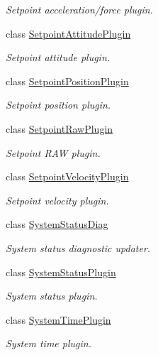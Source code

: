 \begin{DoxyCompactItemize}
\begin{DoxyCompactList}\small\item\em Setpoint acceleration/force plugin. \end{DoxyCompactList}\item 
class \mbox{\hyperlink{classmavros_1_1std__plugins_1_1SetpointAttitudePlugin}{Setpoint\+Attitude\+Plugin}}
\begin{DoxyCompactList}\small\item\em Setpoint attitude plugin. \end{DoxyCompactList}\item 
class \mbox{\hyperlink{classmavros_1_1std__plugins_1_1SetpointPositionPlugin}{Setpoint\+Position\+Plugin}}
\begin{DoxyCompactList}\small\item\em Setpoint position plugin. \end{DoxyCompactList}\item 
class \mbox{\hyperlink{classmavros_1_1std__plugins_1_1SetpointRawPlugin}{Setpoint\+Raw\+Plugin}}
\begin{DoxyCompactList}\small\item\em Setpoint R\+AW plugin. \end{DoxyCompactList}\item 
class \mbox{\hyperlink{classmavros_1_1std__plugins_1_1SetpointVelocityPlugin}{Setpoint\+Velocity\+Plugin}}
\begin{DoxyCompactList}\small\item\em Setpoint velocity plugin. \end{DoxyCompactList}\item 
class \mbox{\hyperlink{classmavros_1_1std__plugins_1_1SystemStatusDiag}{System\+Status\+Diag}}
\begin{DoxyCompactList}\small\item\em System status diagnostic updater. \end{DoxyCompactList}\item 
class \mbox{\hyperlink{classmavros_1_1std__plugins_1_1SystemStatusPlugin}{System\+Status\+Plugin}}
\begin{DoxyCompactList}\small\item\em System status plugin. \end{DoxyCompactList}\item 
class \mbox{\hyperlink{classmavros_1_1std__plugins_1_1SystemTimePlugin}{System\+Time\+Plugin}}
\begin{DoxyCompactList}\small\item\em System time plugin. \end{DoxyCompactList}\item 

\end{DoxyCompactItemize}
